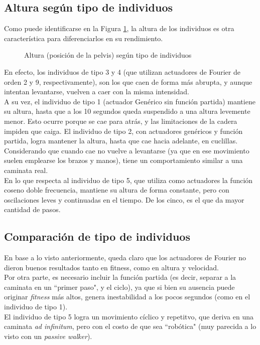 \documentclass{article}
\begin{document}
\subsection{Altura seg\'un tipo de individuos}
Como puede identificarse en la Figura \ref{fig:resultados_altura}, la altura de los individuos es otra caracter\'istica para diferenciarlos en su rendimiento.
\begin{figure}[H]%
  \centering
  \caption{Altura (posici\'on de la pelvis) seg\'un tipo de individuos}%
  \label{fig:resultados_altura} %
\end{figure}
\noindent En efecto, los individuos de tipo 3 y 4 (que utilizan actuadores de Fourier de orden 2 y 9, respectivamente), son los que caen de forma m\'as abrupta, y aunque intentan levantarse, vuelven a caer con la misma intensidad. \\
A su vez, el individuo de tipo 1 (actuador Gen\'erico sin funci\'on partida) mantiene su altura, hasta que a los 10 segundos queda suspendido a una altura levemente menor. Esto ocurre porque se cae para atr\'as, y las limitaciones de la cadera impiden que caiga. El individuo de tipo 2, con actuadores gen\'ericos y funci\'on partida, logra mantener la altura, hasta que cae hacia adelante, en cuclillas. Considerando que cuando cae no vuelve a levantarse (ya que en ese movimiento suelen emplearse los brazos y manos), tiene un comportamiento similar a una caminata real. \\
En lo que respecta al individuo de tipo 5, que utiliza como actuadores la funci\'on coseno doble frecuencia, mantiene su altura de forma constante, pero con oscilaciones leves y continuadas en el tiempo. De los cinco, es el que da mayor cantidad de pasos.


\subsection{Comparaci\'on de tipo de individuos}
En base a lo visto anteriormente, queda claro que los actuadores de Fourier no dieron buenos resultados tanto en fitness, como en altura y velocidad.\\
Por otra parte, es necesario incluir la funci\'on partida (es decir, separar a la caminata en un ``primer paso", y el ciclo), ya que si bien su ausencia puede originar \textit{fitness} m\'as altos, genera inestabilidad a los pocos segundos (como en el individuo de tipo 1).\\
El individuo de tipo 5 logra un movimiento c\'iclico y repetitvo, que deriva en una caminata \textit{ad infinitum}, pero con el costo de que sea ``rob\'otica" (muy parecida a lo visto con un \textit{passive walker}). 
\end{document}

